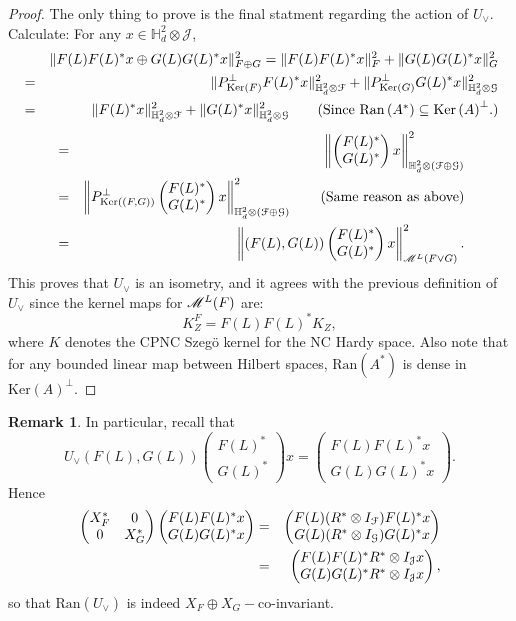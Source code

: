 \documentclass[11pt]{article}
\newcommand{\ba}{\begin{eqnarray}}
\newcommand{\ea}{\end{eqnarray}}
\newcommand{\bpm}{\begin{pmatrix}}
\newcommand{\epm}{\end{pmatrix}}
\newcommand{\nn}{\nonumber}
\newcommand{\scr}{\ensuremath{\mathscr}}
\newcommand{\mc}{\ensuremath{\mathcal}}
\def\bH{\mathbb{H}}
\newcommand{\J}{\ensuremath{\mathcal{J} }}
\newcommand{\ran}[1]{\ensuremath{\mathrm{Ran} \left( {#1} \right) }}
\renewcommand{\ker}[1]{\ensuremath{\mathrm{Ker} \left( {#1} \right) }}
\numberwithin{equation}{section}
\numberwithin{subsection}{section}
\theoremstyle{definition}
\newtheorem{remark}[subsection]{Remark}
\begin{document}
\begin{proof}
The only thing to prove is the final statment regarding the action of $U_\vee$. Calculate: For any $x \in \bH ^2 _d \otimes \J$,
\ba 
& & \| F(L) F(L) ^* x \oplus  G(L) G(L) ^* x \| _{F\oplus G} ^2  =  \| F(L) F(L) ^* x \| ^2 _F + \| G(L) G(L) ^* x \| ^2 _G \nn \\
& =& \| P_{\ker{F}} ^\perp F(L) ^* x \| ^2 _{\bH ^2 _d \otimes \mc{F}} + \| P _{\ker{G}} ^\perp G(L) ^* x \| ^2 _{\bH ^2 _d \otimes \mc{G}} \nn \\
& =& \|  F(L) ^* x \| ^2 _{\bH ^2 _d \otimes \mc{F}} + \|  G(L) ^* x \| ^2 _{\bH ^2 _d \otimes \mc{G}} \quad \quad \mbox{(Since $\ran{A ^* } \subseteq \ker{A} ^\perp$.)}\nn \ea
\ba & = & \left\|  \bpm F(L) ^* \\  G(L) ^* \epm x  \right\| ^2 _{\bH ^2 _d \otimes (\mc{F} \oplus \mc{G} )}  \nn \\
& = & \left\| P _{\ker{ (F,G) }} ^\perp  \bpm F(L) ^* \\  G(L) ^* \epm x  \right\| ^2 _{\bH ^2 _d \otimes (\mc{F} \oplus \mc{G} )} \quad \quad \mbox{(Same reason as above)} \nn \\
& = & \left\| \left( F(L) , G(L) \right)  \bpm F(L) ^* \\  G(L) ^* \epm x  \right\| ^2 _{\scr{M} ^L (F \vee G)}. \nn
\ea
This proves that $U_\vee$ is an isometry, and it agrees with the previous definition of $U_\vee$ since the kernel maps for $\scr{M} ^L (F)$ are:
$$ K^F _Z = F(L) F(L) ^* K_Z, $$ where $K$ denotes the CPNC Szeg\"{o} kernel for the NC Hardy space. Also note that for any bounded linear map between Hilbert spaces, $\ran{A^*}$ is dense in $\ker{A} ^\perp$.
\end{proof}


\begin{remark}
In particular, recall that 
$$ U_\vee \left( F(L), G(L) \right) \bpm F(L) ^* \\ G(L) ^* \epm x = \bpm F(L) F(L) ^* x \\ G(L) G(L) ^* x \epm. $$
Hence 
\ba  \bpm X_F ^* & 0 \\ 0 & X_G ^* \epm \bpm F(L) F(L) ^* x \\ G(L) G(L) ^* x \epm 
& = &  \bpm F(L) (R ^*  \otimes I_\mc{F} ) F(L) ^* x \\ G(L) (R ^* \otimes I_{\mc{G}} ) G(L) ^*x  \epm \nn \\
& = & \bpm F(L) F(L) ^* R ^* \otimes I_{\mc{J}} x \\ G(L) G(L) ^* R ^* \otimes I_{\mc{J}} x \epm, \nn \ea 
so that $\ran{U_\vee}$ is indeed $X_F \oplus X_G - $co-invariant.
\end{remark}
\end{document}
